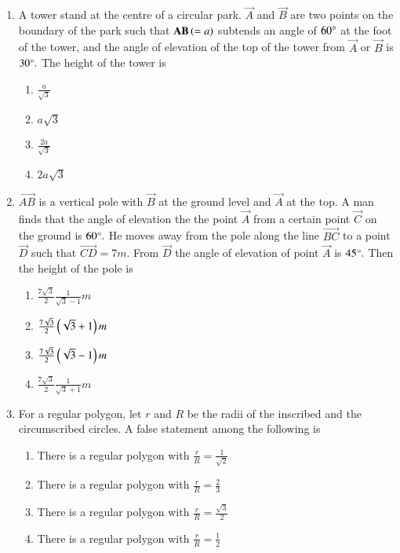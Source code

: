 \documentclass[journal]{IEEEtran}
\theoremstyle{remark}
\begin{document}
\begin{enumerate}[start=3]
\item A tower stand at the centre of a circular park. $\vec{A}$ and $\vec{B}$ are two points on the boundary of the park such that $\mathbf{AB}\left(=a\right)$ subtends an angle of $60\degree$ at the foot of the tower, and the angle of elevation of the top of the tower from $\vec{A}$ or $\vec{B}$ is $30\degree.$ The height of the tower is \hfill{}
\begin{multicols}{4}
\begin{enumerate}
        \item $\frac{a}{\sqrt{3}}$                    
        \item $a\sqrt{3}$ 
        \item $\frac{2a}{\sqrt{3}}$ 
        \item $2a\sqrt{3}$
\end{enumerate}
\end{multicols} 

\item $\vec{AB}$ is a vertical pole with $\vec{B}$ at the ground level and $\vec{A}$ at the top. A man finds that the angle of elevation the the point $\vec{A}$ from a certain point $\vec{C}$ on the ground is $60\degree.$ He moves away from the pole along the line $\vec{BC}$ to a point $\vec{D}$ such that $\vec{CD}=7m.$ From $\vec{D}$ the angle of elevation of point $\vec{A}$ is $45\degree.$ Then the height of the pole is  

\hfill{}
\begin{multicols}{4}
\begin{enumerate}
        \item $\frac{7\sqrt{3}}{2}\frac{1}{\sqrt{3}-1}m$          
        \item $\frac{7\sqrt{3}}{2}\left(\sqrt{3}+1\right)m$ 
        \item $\frac{7\sqrt{3}}{2}\left(\sqrt{3}-1\right)m$ 
        \item $\frac{7\sqrt{3}}{2}\frac{1}{\sqrt{3}+1}m$
\end{enumerate}
\end{multicols} 

\item For a regular polygon, let $r$ and $R$ be the radii of the inscribed and the circumscribed circles. A false statement among the following is \hfill{}
\begin{enumerate}
        \item There is a regular polygon with $\frac{r}{R}=\frac{1}{\sqrt{2}}$                    
        \item There is a regular polygon with $\frac{r}{R}=\frac{2}{3}$ 
        \item There is a regular polygon with $\frac{r}{R}=\frac{\sqrt{3}}{2}$ 
        \item There is a regular polygon with $\frac{r}{R}=\frac{1}{2}$
\end{enumerate}


\end{enumerate}
\end{document}
